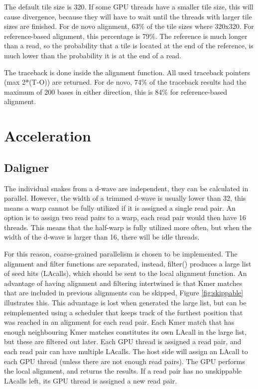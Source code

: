 \documentclass[../thesis.tex]{subfiles}
\begin{document}
The default tile size is 320.
If some GPU threads have a smaller tile size, this will cause divergence, because they will have to wait until the threads with larger tile sizes are finished.
For de novo alignment, 63\% of the tile sizes where 320x320.
For reference-based alignment, this percentage is 79\%.
The reference is much longer than a read, so the probability that a tile is located at the end of the reference, is much lower than the probability it is at the end of a read.

The traceback is done inside the alignment function.
All used traceback pointers (max 2*(T-O)) are returned.
For de novo, 74\% of the traceback results had the maximum of 200 bases in either direction, this is 84\% for reference-based alignment.



\section{Acceleration}
\subsection{Daligner}
The individual snakes from a d-wave are independent, they can be calculated in parallel.
However, the width of a trimmed d-wave is usually lower than 32, this means a warp cannot be fully utilized if it is assigned a single read pair.
An option is to assign two read pairs to a warp, each read pair would then have 16 threads.
This means that the half-warp is fully utilized more often, but when the width of the d-wave is larger than 16, there will be idle threads.

For this reason, coarse-grained parallelism is chosen to be implemented.
The alignment and filter functions are separated, instead, filter() produces a large list of seed hits (LAcalls), which should be sent to the local alignment function.
An advantage of having alignment and filtering intertwined is that Kmer matches that are included in previous alignments can be skipped, Figure \ref{fig:skippable} illustrates this.
This advantage is lost when generated the large list, but can be reimplemented using a scheduler that keeps track of the furthest position that was reached in an alignment for each read pair.
Each Kmer match that has enough neighbouring Kmer matches constitutes its own LAcall in the large list, but these are filtered out later.
Each GPU thread is assigned a read pair, and each read pair can have multiple LAcalls.
The host side will assign an LAcall to each GPU thread (unless there are not enough read pairs).
The GPU performs the local alignment, and returns the results.
If a read pair has no unskippable LAcalls left, its GPU thread is assigned a new read pair.
\end{document}

